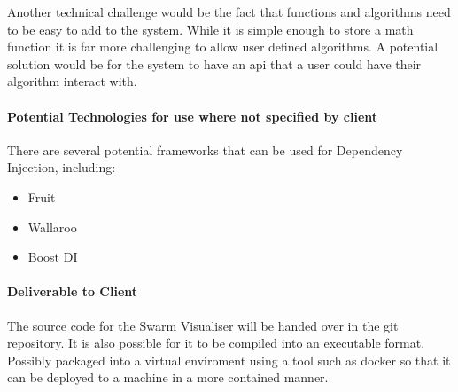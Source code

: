 \documentclass[12pt]{article}
\begin{document}
Another technical challenge would be the fact that functions and algorithms need to be easy to add to the system. While it is simple enough to store a math function it is far more challenging to allow user defined algorithms. A potential solution would be for the system to have an api that a user could have their algorithm interact with.

\paragraph{Potential Technologies for use where not specified by client}
There are several potential frameworks that can be used for Dependency Injection, including:
\begin{itemize}
	\item Fruit
	\item Wallaroo
	\item Boost DI
\end{itemize}

\paragraph{Deliverable to Client}
The source code for the Swarm Visualiser will be handed over in the git repository. It is also possible for it to be compiled into an executable format. Possibly packaged into a virtual enviroment using a tool such as docker so that it can be deployed to a machine in a more contained manner. 
\end{document}
